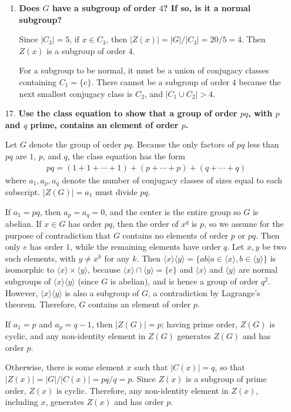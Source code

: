 \documentclass[a4paper,12pt]{article}
\begin{document}
\begin{enumerate}
\begin{enumerate}
            \item
                \boldmath
                \textbf{Does $G$ have a subgroup of order $4$? If so, is it a normal subgroup?} \par
                \unboldmath
                Since $|C_3| = 5$, if $x \in C_3$, then $|Z(x)| = |G|/|C_3| = 20/5 = 4$. Then $Z(x)$ is a subgroup of order $4$. \par
                For a subgroup to be normal, it must be a union of conjugacy classes containing $C_1 = \{ e \}$. There cannot be a subgroup of order $4$ because the next smallest conjugacy class is $C_2$, and $|C_1 \cup C_2| > 4$.
        \end{enumerate}

    \item[17.]
        \boldmath
        \textbf{Use the class equation to show that a group of order $pq$, with $p$ and $q$ prime, contains an element of order $p$.} \par
        \unboldmath
        Let $G$ denote the group of order $pq$. Because the only factors of $pq$ less than $pq$ are $1$, $p$, and $q$, the class equation has the form
        \begin{align*}
            pq = (1 + 1 + \cdots + 1) + (p + \cdots + p) + (q + \cdots + q)
        \end{align*}
        where $a_1, a_p, a_q$ denote the number of conjugacy classes of sizes equal to each subscript. $|Z(G)| = a_1$ must divide $pq$. \par
        If $a_1 = pq$, then $a_p = a_q = 0$, and the center is the entire group so $G$ is abelian. If $x \in G$ has order $pq$, then the order of $x^q$ is $p$, so we assume for the purpose of contradiction that $G$ contains no elements of order $p$ or $pq$. Then only $e$ has order $1$, while the remaining elements have order $q$. Let $x, y$ be two such elements, with $y \neq x^k$ for any $k$. Then $\langle x \rangle \langle y \rangle = \{ ab | a \in \langle x \rangle, b \in \langle y \rangle \}$ is isomorphic to $\langle x \rangle \times \langle y \rangle$, because $\langle x \rangle \cap \langle y \rangle = \{ e \}$ and $\langle x \rangle$ and $\langle y \rangle$ are normal subgroups of $\langle x \rangle \langle y \rangle$ (since $G$ is abelian), and is hence a group of order $q^2$. However, $\langle x \rangle \langle y \rangle$ is also a subgroup of $G$, a contradiction by Lagrange's theorem. Therefore, $G$ contains an element of order $p$. \par
        If $a_1 = p$ and $a_p = q - 1$, then $|Z(G)| = p$; having prime order, $Z(G)$ is cyclic, and any non-identity element in $Z(G)$ generates $Z(G)$ and has order $p$. \par
        Otherwise, there is some element $x$ such that $|C(x)| = q$, so that $|Z(x)| = |G|/|C(x)| = pq/q = p$. Since $Z(x)$ is a subgroup of prime order, $Z(x)$ is cyclic. Therefore, any non-identity element in $Z(x)$, including $x$, generates $Z(x)$ and has order $p$.
\end{enumerate}
\end{document}
